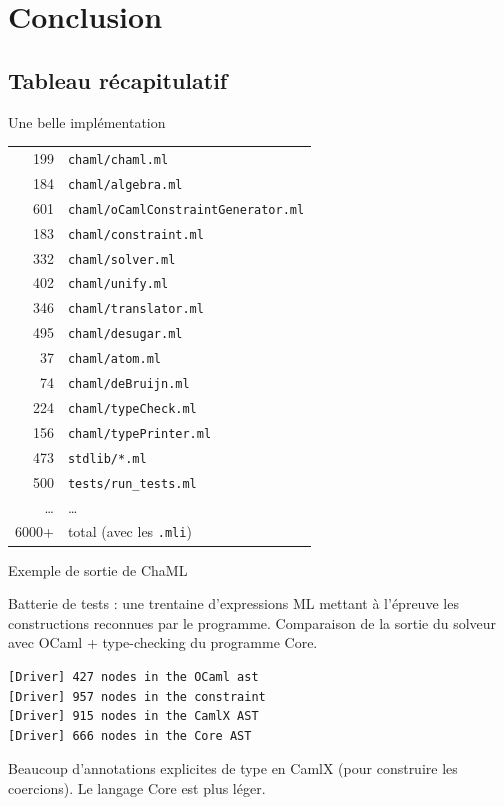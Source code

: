 \documentclass[final]{beamer}
\begin{document}
\section{Conclusion}

\subsection{Tableau récapitulatif}

\begin{frame}{Une belle implémentation}

  \footnotesize

  \begin{tabular}{rl}
    199 & \texttt{chaml/chaml.ml} \\
    184 & \texttt{chaml/algebra.ml} \\
    601 & \texttt{chaml/oCamlConstraintGenerator.ml} \\
    183 & \texttt{chaml/constraint.ml} \\
    332 & \texttt{chaml/solver.ml} \\
    402 & \texttt{chaml/unify.ml} \\
    346 & \texttt{chaml/translator.ml} \\
    495 & \texttt{chaml/desugar.ml} \\
    37 & \texttt{chaml/atom.ml} \\
    74 & \texttt{chaml/deBruijn.ml} \\
    224 & \texttt{chaml/typeCheck.ml} \\
    156 & \texttt{chaml/typePrinter.ml} \\
    473 & \texttt{stdlib/*.ml} \\
    500 & \texttt{tests/run\_tests.ml} \\
    \dots & \dots \\
  6000+ & total (avec les \texttt{.mli})
  \end{tabular}

\end{frame}

\begin{frame}[fragile]{Exemple de sortie de ChaML}

  Batterie de tests : une trentaine d'expressions ML mettant à l'épreuve les
  constructions reconnues par le programme. Comparaison de la sortie du solveur
  avec OCaml + type-checking du programme Core.

  \begin{verbatim}
[Driver] 427 nodes in the OCaml ast
[Driver] 957 nodes in the constraint
[Driver] 915 nodes in the CamlX AST
[Driver] 666 nodes in the Core AST
  \end{verbatim}

  Beaucoup d'annotations explicites de type en CamlX (pour construire les
  coercions). Le langage Core est plus léger.

\end{frame}
\end{document}

